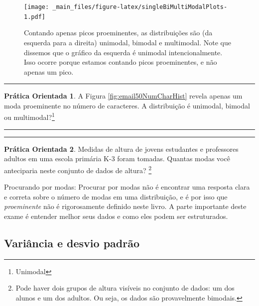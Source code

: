 \documentclass[
]{book}
\theoremstyle{definition}
\theoremstyle{definition}
\theoremstyle{definition}
\newtheorem{exercise}{Prática Orientada}[chapter]
\theoremstyle{definition}
\theoremstyle{remark}
\begin{document}
\begin{figure}
\centering
\texttt{[image: \_main\_files/figure-latex/singleBiMultiModalPlots-1.pdf]}
\caption{\label{fig:singleBiMultiModalPlots}Contando apenas picos proeminentes, as distribuições são (da esquerda para a direita) unimodal, bimodal e multimodal. Note que dissemos que o gráfico da esquerda é unimodal intencionalmente. Isso ocorre porque estamos contando picos proeminentes, e não apenas um pico.}
\end{figure}

\begin{center}\rule{0.5\linewidth}{0.5pt}\end{center}

\begin{exercise}
\protect\hypertarget{exr:unnamed-chunk-23}{}{\label{exr:unnamed-chunk-23} }A Figura \ref{fig:email50NumCharHist} revela apenas um moda proeminente no número de caracteres. A distribuição é unimodal, bimodal ou multimodal?\footnote{Unimodal}
\end{exercise}

\begin{center}\rule{0.5\linewidth}{0.5pt}\end{center}

\begin{center}\rule{0.5\linewidth}{0.5pt}\end{center}

\begin{exercise}
\protect\hypertarget{exr:unnamed-chunk-24}{}{\label{exr:unnamed-chunk-24} }Medidas de altura de jovens estudantes e professores adultos em uma escola primária K-3 foram tomadas. Quantas modas você anteciparia neste conjunto de dados de altura? \footnote{Pode haver dois grupos de altura visíveis no conjunto de dados: um dos alunos e um dos adultos. Ou seja, os dados são provavelmente bimodais.}
\end{exercise}

Procurando por modas: Procurar por modas não é encontrar uma resposta clara e correta sobre o número de modas em uma distribuição, e é por isso que \emph{proeminente} não é rigorosamente definido neste livro. A parte importante deste exame é entender melhor seus dados e como eles podem ser estruturados.

\hypertarget{variability}{%
\subsection{Variância e desvio padrão}\label{variability}}
\end{document}
